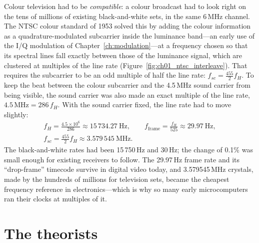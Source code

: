 
\begin{inpractice}
Colour television had to be \emph{compatible}: a colour broadcast had to look right on the tens of
millions of existing black-and-white sets, in the same 6\,MHz channel. The NTSC colour standard of 1953
solved this by adding the colour information as a quadrature-modulated subcarrier inside the luminance
band---an early use of the I/Q modulation of Chapter~\ref{ch:modulation}---at a frequency chosen so that
its spectral lines fall exactly between those of the luminance signal, which are clustered at
multiples of the line rate (Figure~\ref{fig:ch01_ntsc_interleave}). That requires the subcarrier to be
an odd multiple of half the line rate: $f_{sc}=\tfrac{455}{2}f_H$. To keep the beat between the colour
subcarrier and the 4.5\,MHz sound carrier from being visible, the sound carrier was also made an exact
multiple of the line rate, $4.5\,\mathrm{MHz} = 286\,f_H$. With the sound carrier fixed, the line rate
had to move slightly:
\begin{gather*}
f_H = \frac{4.5\times10^6}{286} \approx 15\,734.27\ \mathrm{Hz},\qquad
f_{\text{frame}} = \frac{f_H}{525}\approx 29.97\ \mathrm{Hz},\\
f_{sc} = \tfrac{455}{2}f_H \approx 3.579\,545\ \mathrm{MHz}.
\end{gather*}
The black-and-white rates had been 15\,750\,Hz and 30\,Hz; the change of 0.1\% was small enough for
existing receivers to follow. The 29.97\,Hz frame rate and its ``drop-frame'' timecode survive in
digital video today, and 3.579545\,MHz crystals, made by the hundreds of millions for television sets,
became the cheapest frequency reference in electronics---which is why so many early microcomputers ran
their clocks at multiples of it.
\end{inpractice}


\chOneNeed
\section{The theorists}
\label{sec:ch01:theory}

